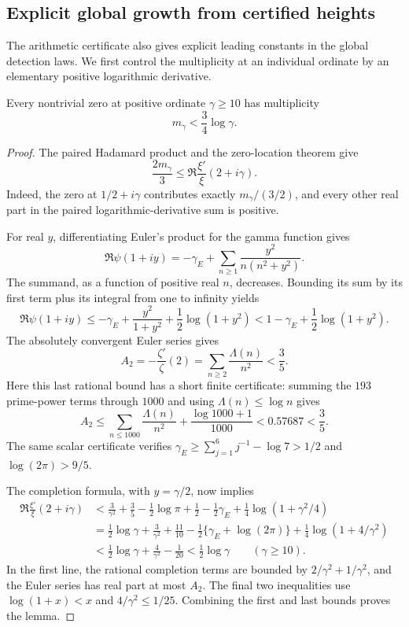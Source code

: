 \subsection{Explicit global growth from certified heights}
\label{sec:fd-global-growth-numeric}

The arithmetic certificate also gives explicit leading constants
in the global detection laws. We first control the multiplicity at an
individual ordinate by an elementary positive logarithmic derivative.

\begin{lemma}
\label{lem:fd-multiplicity-log}
Every nontrivial zero at positive ordinate \(\gamma\ge10\) has
multiplicity
\[
 m_\gamma<\frac34\log\gamma.
\]
\end{lemma}
\begin{proof}
The paired Hadamard product and the zero-location theorem give
\[
 \frac{2m_\gamma}{3}
 \le\Re\frac{\xi'}{\xi}(2+i\gamma).
\]
Indeed, the zero at \(1/2+i\gamma\) contributes exactly
\(m_\gamma/(3/2)\), and every other real part in the paired
logarithmic-derivative sum is positive.

For real \(y\), differentiating Euler's product for the gamma
function gives
\[
 \Re\psi(1+iy)=-\gamma_E+
       \sum_{n\ge1}\frac{y^2}{n(n^2+y^2)}.
\]
The summand, as a function of positive real \(n\), decreases.
Bounding its sum by its first term plus its integral from one to
infinity yields
\[
 \Re\psi(1+iy)
 \le-\gamma_E+\frac{y^2}{1+y^2}
                +\frac12\log(1+y^2)
 <1-\gamma_E+\frac12\log(1+y^2).
\]
The absolutely convergent Euler series gives
\[
 A_2=-\frac{\zeta'}{\zeta}(2)=\sum_{n\ge2}\frac{\Lambda(n)}{n^2}
 <\frac35.
\]
Here this last rational bound has a short finite certificate: summing
the \(193\) prime-power terms through \(1000\) and using
\(\Lambda(n)\le\log n\) gives
\[
 A_2\le\sum_{n\le1000}\frac{\Lambda(n)}{n^2}
             +\frac{\log1000+1}{1000}
 <0.57687<\frac35.
\]
The same scalar certificate verifies
\(\gamma_E\ge\sum_{j=1}^{6}j^{-1}-\log7>1/2\) and
\(\log(2\pi)>9/5\).

The completion formula, with \(y=\gamma/2\), now implies
\begin{align*}
 \Re\frac{\xi'}{\xi}(2+i\gamma)
 &<\frac3{\gamma^2}+\frac35-\frac12\log\pi
     +\frac12-\frac12\gamma_E
     +\frac14\log(1+\gamma^2/4)\\
 &=\frac12\log\gamma+\frac3{\gamma^2}+\frac{11}{10}
     -\frac12\{\gamma_E+\log(2\pi)\}
     +\frac14\log(1+4/\gamma^2)\\
 &<\frac12\log\gamma+\frac4{\gamma^2}-\frac1{20}
 <\frac12\log\gamma\qquad(\gamma\ge10).
\end{align*}
In the first line, the rational completion terms are bounded by
\(2/\gamma^2+1/\gamma^2\), and the Euler series has real part at
most \(A_2\). The final two inequalities use
\(\log(1+x)<x\) and \(4/\gamma^2\le1/25\).
Combining the first and last bounds proves the lemma.
\end{proof}

